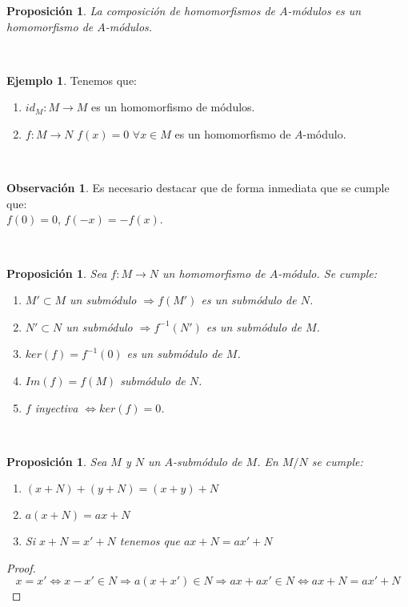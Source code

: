 \documentclass{article}
\theoremstyle{theorem-style}  %
\newtheorem{proposition}[theorem]{Proposición}
\theoremstyle{definition}
\newtheorem*{observation}{Observación} %
\theoremstyle{example-style}
\newtheorem{example}{Ejemplo}[section]
\begin{document}
	\begin{proposition}
		La composición de homomorfismos de $A$-módulos es un homomorfismo de $A$-módulos.
	\end{proposition}
	\ 

	\begin{example} Tenemos que:
		\begin{enumerate}
			\item $id_M : M \rightarrow M$ es un homomorfismo de módulos.
			\item $f: M \rightarrow N$ $f(x) = 0$ $\forall x \in M$ es un homomorfismo de $A$-módulo.
		\end{enumerate}
	\end{example}
	\ 

	\begin{observation}
		Es necesario destacar que de forma inmediata que se cumple que:\\ $f(0) = 0$, $f(-x) = -f(x)$.
	\end{observation}
	\ 

	\begin{proposition}
		Sea $f: M \rightarrow N$ un homomorfismo de $A$-módulo. Se cumple:
		\begin{enumerate}
			\item $M'  \subset M$ un submódulo $\Rightarrow f(M')$ es un submódulo de $N$.
			\item $N' \subset N$ un submódulo $\Rightarrow f^{-1}(N')$ es un submódulo de $M$.
			\item $ker(f) = f^{-1}(0)$ es un submódulo de $M$.
			\item $Im(f) = f(M)$ submódulo de $N$.
			\item $f$ inyectiva  $\Leftrightarrow ker(f) = 0$.
		\end{enumerate}
	\end{proposition}
	\ 

	\begin{proposition}
		Sea $M$ y $N$ un $A$-submódulo de $M$. En $M/N$ se cumple:
		\begin{enumerate}
			\item$(x + N) + (y + N) =(x +y) + N$
			\item $a(x + N) = ax + N $
			\item Si $x + N = x\prime +N$ tenemos que  $ax +N=ax\prime +N$
		\end{enumerate}
	\end{proposition}

	\begin{proof}
		\[x=x\prime \Leftrightarrow x-x\prime \in N \Rightarrow a(x +x\prime)\in N \Rightarrow ax+ax\prime \in N \Leftrightarrow ax+N=ax\prime+N\]
	\end{proof}
\end{document}
